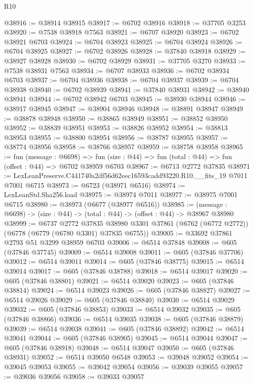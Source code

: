 \begin{lexlean}{R10}
\begin{coremodule}
@38916 := @38914 @38915
@38917 := @6702 @38916
@38918 := @37705 @3253
@38920 := @7538 @38918 @7563
@38921 := @6707 @38920
@38923 := @6702 @38921 @6703
@38924 := @6704 @38923
@38925 := @6704 @38924
@38926 := @6704 @38925
@38927 := @6702 @38926
@38928 := @37840 @38918
@38929 := @38927 @38928
@38930 := @6702 @38929
@38931 := @37705 @3270
@38933 := @7538 @38931 @7563
@38934 := @6707 @38933
@38936 := @6702 @38934 @6703
@38937 := @6704 @38936
@38938 := @6704 @38937
@38939 := @6704 @38938
@38940 := @6702 @38939
@38941 := @37840 @38931
@38942 := @38940 @38941
@38944 := @6702 @38942 @6703
@38945 := @38930 @38944
@38946 := @38917 @38945
@38947 := @38904 @38946
@38948 := @38891 @38947
@38949 := @38878 @38948
@38950 := @38865 @38949
@38951 := @38852 @38950
@38952 := @38839 @38951
@38953 := @38826 @38952
@38954 := @38813 @38953
@38955 := @38800 @38954
@38956 := @38787 @38955
@38957 := @38774 @38956
@38958 := @38766 @38957
@38959 := @38758 @38958
@38965 := fun (message : @6698) =>
  fun (size : @44) => fun (total : @44) => fun (offset : @44) => @6702 @38959 @6703
@38967 := @6713 @2772 @37835
@38971 := LexLeanPreserve.C441740a2df56d62eec16593cadd93220.R10.__fits_19 @7011 @7001 @6715
@38973 := @6723 (@38971 @6516)
@38974 := LexLeanStd.Sha256.load
@38975 := @38974 @7011
@38977 := @38975 @7001 @6715
@38980 := @38973 (@6677 (@38977 @6516))
@38985 := (message : @6698) -> (size : @44) -> (total : @44) -> (offset : @44) -> @38967 @38980
@38999 := @6737
    @2772
    @37835
    @38980
    @3301
    @37861
    (@6762 (@6772 @2772))
    (@6778 (@6779 (@6780 @3301) @37835 @6755))
@39005 := @33692 @37861 @2793 @51 @3299 @38959 @6703
@39006 := @6514 @37848
@39008 := @605 (@37846 @37745)
@39009 := @6514 @39008
@39011 := @605 (@37846 @37706)
@39012 := @6514 @39011
@39014 := @605 (@37846 @38775)
@39015 := @6514 @39014
@39017 := @605 (@37846 @38788)
@39018 := @6514 @39017
@39020 := @605 (@37846 @38801)
@39021 := @6514 @39020
@39023 := @605 (@37846 @38814)
@39024 := @6514 @39023
@39026 := @605 (@37846 @38827)
@39027 := @6514 @39026
@39029 := @605 (@37846 @38840)
@39030 := @6514 @39029
@39032 := @605 (@37846 @38853)
@39033 := @6514 @39032
@39035 := @605 (@37846 @38866)
@39036 := @6514 @39035
@39038 := @605 (@37846 @38879)
@39039 := @6514 @39038
@39041 := @605 (@37846 @38892)
@39042 := @6514 @39041
@39044 := @605 (@37846 @38905)
@39045 := @6514 @39044
@39047 := @605 (@37846 @38918)
@39048 := @6514 @39047
@39050 := @605 (@37846 @38931)
@39052 := @6514 @39050 @6548
@39053 := @39048 @39052
@39054 := @39045 @39053
@39055 := @39042 @39054
@39056 := @39039 @39055
@39057 := @39036 @39056
@39058 := @39033 @39057

\end{coremodule}
\end{lexlean}
